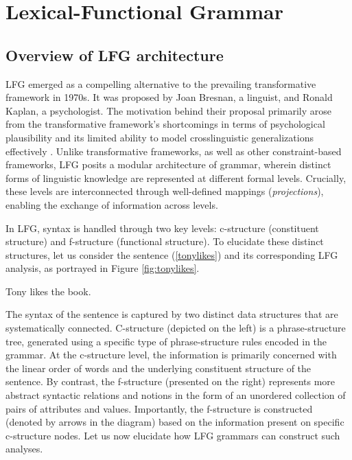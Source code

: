 \section{Lexical-Functional Grammar} \label{sec:lfg}

\subsection{Overview of LFG architecture}

LFG emerged as a compelling alternative to the prevailing transformative framework in 1970s. It was proposed by Joan Bresnan, a linguist, and Ronald Kaplan, a psychologist. The motivation behind their proposal primarily arose from the transformative framework's shortcomings in terms of psychological plausibility and its limited ability to model crosslinguistic generalizations effectively \citep[pp.\ 1--2]{Dalrymple2019}. Unlike transformative frameworks, as well as other constraint-based frameworks, LFG posits a modular architecture of grammar, wherein distinct forms of linguistic knowledge are represented at different formal levels. Crucially, these levels are interconnected through well-defined mappings (\textit{projections}), enabling the exchange of information across levels.

In LFG, syntax is handled through two key levels: c-structure (constituent structure) and f-structure (functional structure). To elucidate these distinct structures, let us consider the sentence (\ref{tonylikes}) and its corresponding LFG analysis, as portrayed in Figure \ref{fig:tonylikes}.

\pex
\label{tonylikes}
Tony likes the book.
\xe

The syntax of the sentence is captured by two distinct data structures that are systematically connected. C-structure (depicted on the left) is a phrase-structure tree, generated using a specific type of phrase-structure rules encoded in the grammar. At the c-structure level, the information is primarily concerned with the linear order of words and the underlying constituent structure of the sentence. By contrast, the f-structure (presented on the right) represents more abstract syntactic relations and notions in the form of an unordered collection of pairs of attributes and values. Importantly, the f-structure is constructed (denoted by arrows in the diagram) based on the information present on specific c-structure nodes. Let us now elucidate how LFG grammars can construct such analyses.


